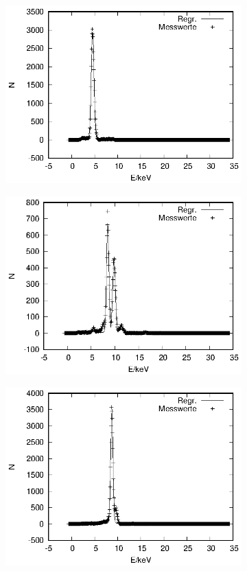 \begin{figure}[!h]
\begin{subfigure}[h]{0.5\textwidth}
    \includegraphics{data/Massenanteil/ti.eps}
  \end{subfigure}%
  \begin{subfigure}[h]{0.5\textwidth}
    \centering
    \includegraphics{data/Massenanteil/w.eps}
  \end{subfigure}
  \begin{subfigure}[h]{0.5\textwidth}
    \centering
    \includegraphics{data/Massenanteil/zn.eps}

\end{subfigure}
\end{figure}
